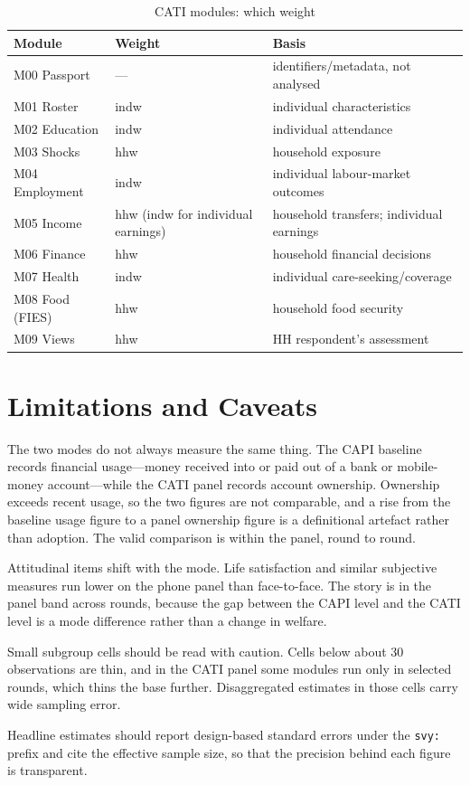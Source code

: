 \documentclass[AEJ]{AEA}
\begin{document}
\begin{table}[!t]
\raggedright
\begin{threeparttable}
\caption{CATI modules: which weight}
\label{tab:usecati}
\footnotesize
\begin{tabularx}{\textwidth}{@{}Y{0.7} Y{0.7} Y{1.6}@{}}
\toprule
Module & Weight & Basis \\
\midrule
M00 Passport & --- & identifiers/metadata, not analysed \\
M01 Roster & indw & individual characteristics \\
M02 Education & indw & individual attendance \\
M03 Shocks & hhw & household exposure \\
M04 Employment & indw & individual labour-market outcomes \\
M05 Income & hhw (indw for individual earnings) & household transfers; individual earnings \\
M06 Finance & hhw & household financial decisions \\
M07 Health & indw & individual care-seeking/coverage \\
M08 Food (FIES) & hhw & household food security \\
M09 Views & hhw & HH respondent's assessment \\
\bottomrule
\end{tabularx}
\end{threeparttable}
\end{table}

\section{Limitations and Caveats}

The two modes do not always measure the same thing. The CAPI baseline records
financial usage---money received into or paid out of a bank or mobile-money
account---while the CATI panel records account ownership. Ownership exceeds recent
usage, so the two figures are not comparable, and a rise from the baseline usage
figure to a panel ownership figure is a definitional artefact rather than adoption.
The valid comparison is within the panel, round to round.

Attitudinal items shift with the mode. Life satisfaction and similar subjective
measures run lower on the phone panel than face-to-face. The story is in the panel
band across rounds, because the gap between the CAPI level and the CATI level is a
mode difference rather than a change in welfare.

Small subgroup cells should be read with caution. Cells below about 30
observations are thin, and in the CATI panel some modules run only in selected
rounds, which thins the base further. Disaggregated estimates in those cells carry
wide sampling error.

Headline estimates should report design-based standard errors under the
\texttt{svy:} prefix and cite the effective sample size, so that the precision
behind each figure is transparent.
\end{document}
